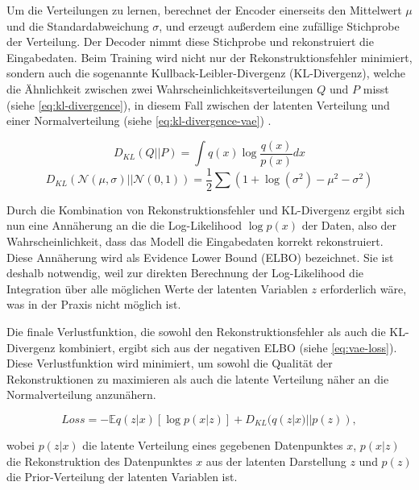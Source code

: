 Um die Verteilungen zu lernen, berechnet der Encoder einerseits den Mittelwert $\mu$ und die Standardabweichung $\sigma$, und erzeugt außerdem eine zufällige Stichprobe der Verteilung. Der Decoder nimmt diese Stichprobe und rekonstruiert die Eingabedaten. Beim Training wird nicht nur der Rekonstruktionsfehler minimiert, sondern auch die sogenannte Kullback-Leibler-Divergenz (KL-Divergenz), welche die Ähnlichkeit zwischen zwei Wahrscheinlichkeitsverteilungen $Q$ und $P$ misst (siehe \autoref{eq:kl-divergence}), in diesem Fall zwischen der latenten Verteilung und einer Normalverteilung (siehe \autoref{eq:kl-divergence-vae}) \parencite{Foster2020gendeeplearning}.

\begin{equation}
	D_{KL}\left(Q || P\right) = \int q(x) \log \frac{q(x)}{p(x)}dx
	\label{eq:kl-divergence}
\end{equation}
\begin{equation}
	D_{KL}\left(\mathcal{N}(\mu,\sigma) || \mathcal{N}(0,1)\right) = \frac{1}{2} \sum (1 + \log(\sigma^2) - \mu^2 - \sigma^2)
	\label{eq:kl-divergence-vae}
\end{equation}

Durch die Kombination von Rekonstruktionsfehler und KL-Divergenz ergibt sich nun eine Annäherung an die die Log-Likelihood $\log p(x)$ der Daten, also der Wahrscheinlichkeit, dass das Modell die Eingabedaten korrekt rekonstruiert. Diese Annäherung wird als Evidence Lower Bound (ELBO) bezeichnet. Sie ist deshalb notwendig, weil zur direkten Berechnung der Log-Likelihood die Integration über alle möglichen Werte der latenten Variablen $z$ erforderlich wäre, was in der Praxis nicht möglich ist.

Die finale Verlustfunktion, die sowohl den Rekonstruktionsfehler als auch die KL-Divergenz kombiniert, ergibt sich aus der negativen ELBO (siehe \autoref{eq:vae-loss}). Diese Verlustfunktion wird minimiert, um sowohl die Qualität der Rekonstruktionen zu maximieren als auch die latente Verteilung näher an die Normalverteilung anzunähern.

\begin{equation}
	Loss = -\mathbb{E}{q(z|x)}[\log p(x|z)] + D_{KL}(q(z|x) || p(z)),
	\label{eq:vae-loss}
\end{equation}

wobei $p(z|x)$ die latente Verteilung eines gegebenen Datenpunktes $x$, $p(x|z)$ die Rekonstruktion des Datenpunktes $x$ aus der latenten Darstellung $z$ und $p(z)$ die Prior-Verteilung der latenten Variablen ist.

